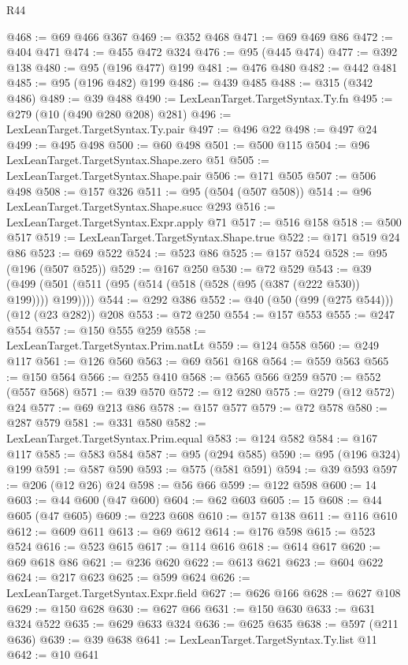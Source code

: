 \begin{lexlean}{R44}
\begin{coremodule}
@468 := @69 @466 @367
@469 := @352 @468
@471 := @69 @469 @86
@472 := @404 @471
@474 := @455 @472 @324
@476 := @95 (@445 @474)
@477 := @392 @138
@480 := @95 (@196 @477) @199
@481 := @476 @480
@482 := @442 @481
@485 := @95 (@196 @482) @199
@486 := @439 @485
@488 := @315 (@342 @486)
@489 := @39 @488
@490 := LexLeanTarget.TargetSyntax.Ty.fn
@495 := @279 (@10 (@490 @280 @208) @281)
@496 := LexLeanTarget.TargetSyntax.Ty.pair
@497 := @496 @22
@498 := @497 @24
@499 := @495 @498
@500 := @60 @498
@501 := @500 @115
@504 := @96 LexLeanTarget.TargetSyntax.Shape.zero @51
@505 := LexLeanTarget.TargetSyntax.Shape.pair
@506 := @171 @505
@507 := @506 @498
@508 := @157 @326
@511 := @95 (@504 (@507 @508))
@514 := @96 LexLeanTarget.TargetSyntax.Shape.succ @293
@516 := LexLeanTarget.TargetSyntax.Expr.apply @71
@517 := @516 @158
@518 := @500 @517
@519 := LexLeanTarget.TargetSyntax.Shape.true
@522 := @171 @519 @24 @86
@523 := @69 @522
@524 := @523 @86
@525 := @157 @524
@528 := @95 (@196 (@507 @525))
@529 := @167 @250
@530 := @72 @529
@543 := @39 (@499 (@501 (@511 (@95 (@514 (@518 (@528 (@95 (@387 (@222 @530)) @199)))) @199))))
@544 := @292 @386
@552 := @40 (@50 (@99 (@275 @544))) (@12 (@23 @282)) @208
@553 := @72 @250
@554 := @157 @553
@555 := @247 @554
@557 := @150 @555 @259
@558 := LexLeanTarget.TargetSyntax.Prim.natLt
@559 := @124 @558
@560 := @249 @117
@561 := @126 @560
@563 := @69 @561 @168
@564 := @559 @563
@565 := @150 @564
@566 := @255 @410
@568 := @565 @566 @259
@570 := @552 (@557 @568)
@571 := @39 @570
@572 := @12 @280
@575 := @279 (@12 @572) @24
@577 := @69 @213 @86
@578 := @157 @577
@579 := @72 @578
@580 := @287 @579
@581 := @331 @580
@582 := LexLeanTarget.TargetSyntax.Prim.equal
@583 := @124 @582
@584 := @167 @117
@585 := @583 @584
@587 := @95 (@294 @585)
@590 := @95 (@196 @324) @199
@591 := @587 @590
@593 := @575 (@581 @591)
@594 := @39 @593
@597 := @206 (@12 @26) @24
@598 := @56 @66
@599 := @122 @598
@600 := 14
@603 := @44 @600 (@47 @600)
@604 := @62 @603
@605 := 15
@608 := @44 @605 (@47 @605)
@609 := @223 @608
@610 := @157 @138
@611 := @116 @610
@612 := @609 @611
@613 := @69 @612
@614 := @176 @598
@615 := @523 @524
@616 := @523 @615
@617 := @114 @616
@618 := @614 @617
@620 := @69 @618 @86
@621 := @236 @620
@622 := @613 @621
@623 := @604 @622
@624 := @217 @623
@625 := @599 @624
@626 := LexLeanTarget.TargetSyntax.Expr.field
@627 := @626 @166
@628 := @627 @108
@629 := @150 @628
@630 := @627 @66
@631 := @150 @630
@633 := @631 @324 @522
@635 := @629 @633 @324
@636 := @625 @635
@638 := @597 (@211 @636)
@639 := @39 @638
@641 := LexLeanTarget.TargetSyntax.Ty.list @11
@642 := @10 @641

\end{coremodule}
\end{lexlean}
